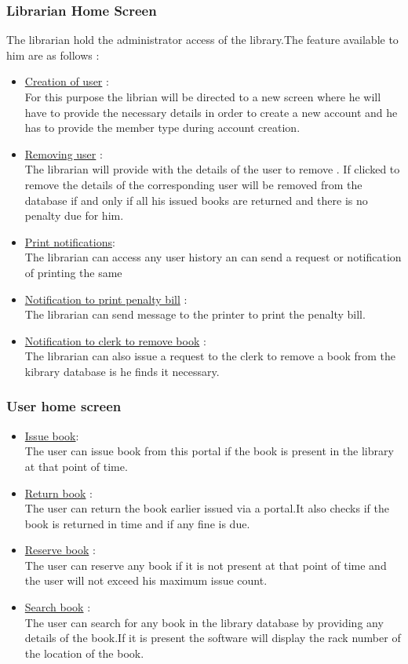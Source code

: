 \documentclass[a4paper]{article}
\begin{document}
\subsubsection*{Librarian Home Screen}
The librarian hold the administrator access of the library.The feature available to him are as follows :
\begin{itemize}
\item \underline{Creation of user} :\\
For this purpose the librian will be directed to a new screen where he will have to provide the necessary details in order to create a new account and he has to provide the member type during account creation.
\item \underline{Removing user} : \\
The librarian will provide with the details of the user to remove . If clicked to remove the details of the corresponding user will be removed from the database if and only if all his issued books are returned and there is no penalty due for him.
\item \underline{Print notifications}:\\ The librarian can access any user history an can send a request or notification of printing the same
\item \underline{Notification to print penalty bill} :\\ The librarian can send message to the printer to print the penalty bill.
\item \underline{Notification to clerk to remove book} :\\
The librarian can also issue a request to the clerk to remove a book from the kibrary database is he finds it necessary.
\end{itemize}

\subsubsection*{User home screen}
\begin{itemize}
\item \underline{Issue book}:\\
The user can issue book from this portal if the book is present in the library at that point of time.
\item \underline{Return book} :\\ The user can return the book earlier issued via a portal.It also checks if the book is returned in time and if any fine is due.
\item \underline{Reserve book} :\\ The user can reserve any book if it is not present at that point of time and the user will not exceed his maximum issue count.
\item \underline{Search book} :\\ The user can search for any book in the library database by providing any details of the book.If it is present the software will display the rack number of the location of the book.

\end{itemize}
\end{document}
